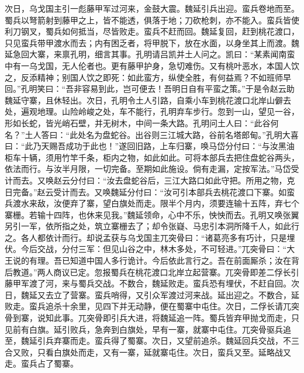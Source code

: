 次日，乌戈国主引一彪藤甲军过河来，金鼓大震。魏延引兵出迎。蛮兵卷地而至。蜀兵以弩箭射到藤甲之上，皆不能透，俱落于地；刀砍枪刺，亦不能入。蛮兵皆使利刀钢叉，蜀兵如何抵当，尽皆败走。蛮兵不赶而回。魏延复回，赶到桃花渡口，只见蛮兵带甲渡水而去；内有困乏者，将甲脱下，放在水面，以身坐其上而渡。魏延急回大寨，来禀孔明，细言其事。孔明请吕凯并土人问之。凯曰：“某素闻南蛮中有一乌戈国，无人伦者也。更有藤甲护身，急切难伤。又有桃叶恶水，本国人饮之，反添精神；别国人饮之即死：如此蛮方，纵使全胜，有何益焉？不如班师早回。”孔明笑曰：“吾非容易到此，岂可便去！吾明日自有平蛮之策。”于是令赵云助魏延守寨，且休轻出。次日，孔明令土人引路，自乘小车到桃花渡口北岸山僻去处，遍观地理。山险岭峻之处，车不能行，孔明弃车步行。忽到一山，望见一谷，形如长蛇，皆光峭石壁，并无树木，中间一条大路。孔明问土人曰：“此谷何名？”土人答曰：“此处名为盘蛇谷。出谷则三江城大路，谷前名塔郎甸。”孔明大喜曰：“此乃天赐吾成功于此也！”遂回旧路，上车归寨，唤马岱分付曰：“与汝黑油柜车十辆，须用竹竿千条，柜内之物，如此如此。可将本部兵去把住盘蛇谷两头，依法而行。与汝半月限，一切完备。至期如此施设。倘有走漏，定按军法。”马岱受计而去。又唤赵云分付曰：“汝去盘蛇谷后，三江大路口如此守把。所用之物，克日完备。”赵云受计而去。又唤魏延分付曰：“汝可引本部兵去桃花渡口下寨。如蛮兵渡水来敌，汝便弃了寨，望白旗处而走。限半个月内，须要连输十五阵，弃七个寨栅。若输十四阵，也休来见我。”魏延领命，心中不乐，怏怏而去。孔明又唤张翼另引一军，依所指之处，筑立寨栅去了；却令张嶷、马忠引本洞所降千人，如此行之。各人都依计而行。却说孟获与乌戈国主兀突骨曰：“诸葛亮多有巧计，只是埋伏。今后交战，分付三军：但见山谷之中，林木多处，不可轻进。”兀突骨曰：“大王说的有理。吾已知道中国人多行诡计。今后依此言行之。吾在前面厮杀；汝在背后教道。”两人商议已定。忽报蜀兵在桃花渡口北岸立起营寨。兀突骨即差二俘长引藤甲军渡了河，来与蜀兵交战。不数合，魏延败走。蛮兵恐有埋伏，不赶自回。次日，魏延又去立了营寨。蛮兵哨得，又引众军渡过河来战。延出迎之。不数合，延败走。蛮兵追杀十余里，见四下并无动静，便在蜀寨中屯住。次日，二俘长请兀突骨到寨，说知此事。兀突骨即引兵大进，将魏延追一阵。蜀兵皆弃甲抛戈而走，只见前有白旗。延引败兵，急奔到白旗处，早有一寨，就寨中屯住。兀突骨驱兵追至，魏延引兵弃寨而走。蛮兵得了蜀寨。次日，又望前追杀。魏延回兵交战，不三合又败，只看白旗处而走，又有一寨，延就寨屯住。次日，蛮兵又至。延略战又走。蛮兵占了蜀寨。

